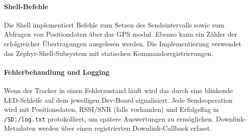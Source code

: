 \paragraph*{Shell-Befehle}
Die Shell implementiert Befehle zum Setzen des Sendeintervalls sowie zum Abfragen von Positiondaten über das GPS modul. Ebenso kann ein Zähler der erfolgreicher Übertragungen ausgelesen werden. Die Implementierung verwendet das Zephyr-Shell-Subsystem mit statischen Kommandoregistrierungen.

\paragraph*{Fehlerbehandlung und Logging}
Wenn der Tracker in einen Fehlerzustand läuft wird das durch eine blinkende LED-Schleife auf dem jeweiligen Dev-Board signalisiert. Jede Sendeoperation wird mit Positionsdaten, RSSI/SNR (falls vorhanden) und Erfolgsflag in \texttt{/SD:/log.txt} protokolliert, um spätere Auswertungen zu ermöglichen. Downlink-Metadaten werden über einen registrierten Downlink-Callback erfasst.